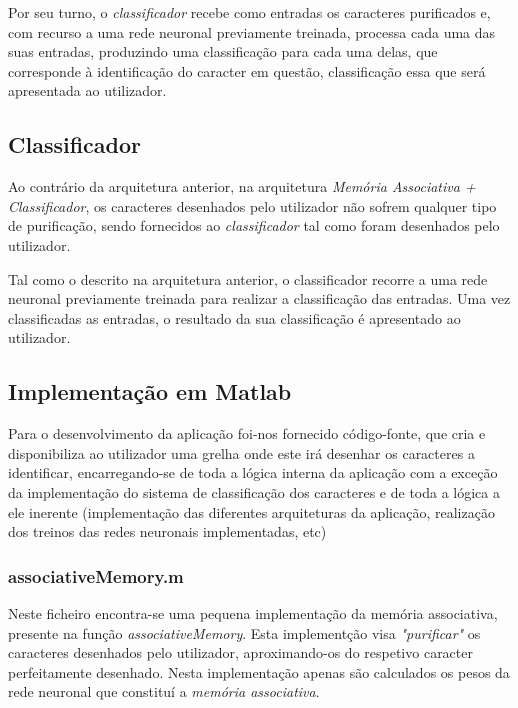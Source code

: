 \documentclass{article}
\begin{document}
Por seu turno, o \emph{classificador} recebe como entradas os caracteres purificados e, com recurso a uma rede neuronal previamente treinada, processa cada uma das suas entradas, produzindo uma classificação para cada uma delas, que corresponde à identificação do caracter em questão, classificação essa que será apresentada ao utilizador.

\subsection{Classificador}

Ao contrário da arquitetura anterior, na arquitetura \emph{Memória Associativa + Classificador}, os caracteres desenhados pelo utilizador não sofrem qualquer tipo de purificação, sendo fornecidos ao \emph{classificador} tal como foram desenhados pelo utilizador.

Tal como o descrito na arquitetura anterior, o classificador recorre a uma rede neuronal previamente treinada para realizar a classificação das entradas. Uma vez classificadas as entradas, o resultado da sua classificação é apresentado ao utilizador.

\pagebreak

\subsection{Implementação em Matlab}

Para o desenvolvimento da aplicação foi-nos fornecido código-fonte, que cria e disponibiliza ao utilizador uma grelha onde este irá desenhar os caracteres a identificar, encarregando-se de toda a lógica interna da aplicação com a exceção da implementação do sistema de classificação dos caracteres e de toda a lógica a ele inerente (implementação das diferentes arquiteturas da aplicação, realização dos treinos das redes neuronais implementadas, etc)

\subsubsection{associativeMemory.m}

Neste ficheiro encontra-se uma pequena implementação da memória associativa, presente na função \emph{associativeMemory}. Esta implementção visa \emph{"purificar"} os caracteres desenhados pelo utilizador, aproximando-os do respetivo caracter perfeitamente desenhado. Nesta implementação apenas são calculados os pesos da rede neuronal que constituí a \emph{memória associativa}.
\end{document}
